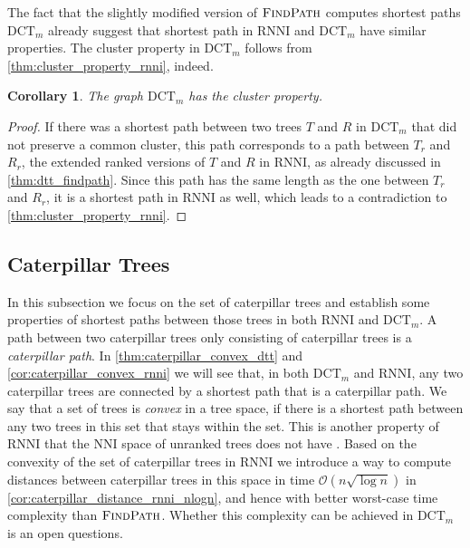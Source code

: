 \documentclass[11pt]{amsart}
\newtheorem{corollary}{Corollary}
\newcommand{\rnni}{\mathrm{RNNI}}
\newcommand{\findpath}{\textsc{FindPath}}
\newcommand{\nni}{\mathrm{NNI}}
\newcommand{\dtt}{\mathrm{DCT}}
\renewcommand{\O}{\mathcal O}
\newcommand{\summary}[1]{} %
\begin{document}
The fact that the slightly modified version of $\findpath$ computes shortest paths $\dtt_m$ already suggest that shortest path in $\rnni$ and $\dtt_m$ have similar properties.
The cluster property in $\dtt_m$ follows from \autoref{thm:cluster_property_rnni}, indeed.

\begin{corollary}
	The graph $\dtt_m$ has the cluster property.
\end{corollary}

\begin{proof}
	If there was a shortest path between two trees $T$ and $R$ in $\dtt_m$ that did not preserve a common cluster, this path corresponds to a path between $T_r$ and $R_r$, the extended ranked versions of $T$ and $R$ in $\rnni$, as already discussed in \autoref{thm:dtt_findpath}.
	Since this path has the same length as the one between $T_r$ and $R_r$, it is a shortest path in $\rnni$ as well, which leads to a contradiction to \autoref{thm:cluster_property_rnni}.
\end{proof}

\subsection{Caterpillar Trees}
\label{section:caterpillar_convex}

\summary{Defining Caterpillar trees. Why are they interesting?}
In this subsection we focus on the set of caterpillar trees and establish some properties of shortest paths between those trees in both $\rnni$ and $\dtt_m$.
A path between two caterpillar trees only consisting of caterpillar trees is a \emph{caterpillar path}.
In \autoref{thm:caterpillar_convex_dtt} and \autoref{cor:caterpillar_convex_rnni} we will see that, in both $\dtt_m$ and $\rnni$, any two caterpillar trees are connected by a shortest path that is a caterpillar path.
We say that a set of trees is \emph{convex} in a tree space, if there is a shortest path between any two trees in this set that stays within the set.
This is another property of $\rnni$ that the $\nni$ space of unranked trees does not have \autocite{Gavryushkin2018-ol}.
Based on the convexity of the set of caterpillar trees in $\rnni$ we introduce a way to compute distances between caterpillar trees in this space in time $\O(n \sqrt{\log n})$ in \autoref{cor:caterpillar_distance_rnni_nlogn}, and hence with better worst-case time complexity than $\findpath$.
Whether this complexity can be achieved in $\dtt_m$ is an open questions.
\end{document}

